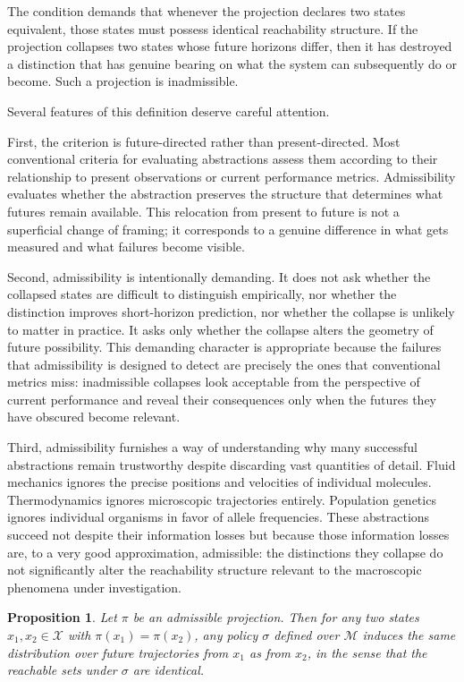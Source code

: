 \documentclass[12pt,a4paper]{article}
\theoremstyle{plain}
\newtheorem{proposition}{Proposition}
\theoremstyle{definition}
\theoremstyle{remark}
\begin{document}
The condition demands that whenever the projection declares two states
equivalent, those states must possess identical reachability structure. If
the projection collapses two states whose future horizons differ, then it has
destroyed a distinction that has genuine bearing on what the system can
subsequently do or become. Such a projection is inadmissible.

Several features of this definition deserve careful attention.

First, the criterion is future-directed rather than present-directed. Most
conventional criteria for evaluating abstractions assess them according to
their relationship to present observations or current performance metrics.
Admissibility evaluates whether the abstraction preserves the structure that
determines what futures remain available. This relocation from present to
future is not a superficial change of framing; it corresponds to a genuine
difference in what gets measured and what failures become visible.

Second, admissibility is intentionally demanding. It does not ask whether
the collapsed states are difficult to distinguish empirically, nor whether
the distinction improves short-horizon prediction, nor whether the collapse
is unlikely to matter in practice. It asks only whether the collapse alters
the geometry of future possibility. This demanding character is appropriate
because the failures that admissibility is designed to detect are precisely
the ones that conventional metrics miss: inadmissible collapses look
acceptable from the perspective of current performance and reveal their
consequences only when the futures they have obscured become relevant.

Third, admissibility furnishes a way of understanding why many successful
abstractions remain trustworthy despite discarding vast quantities of detail.
Fluid mechanics ignores the precise positions and velocities of individual
molecules. Thermodynamics ignores microscopic trajectories entirely.
Population genetics ignores individual organisms in favor of allele
frequencies. These abstractions succeed not despite their information losses
but because those information losses are, to a very good approximation,
admissible: the distinctions they collapse do not significantly alter the
reachability structure relevant to the macroscopic phenomena under
investigation.

\begin{proposition}
Let $\pi$ be an admissible projection. Then for any two states
$x_1, x_2 \in \mathcal{X}$ with $\pi(x_1) = \pi(x_2)$, any policy
$\sigma$ defined over $\mathcal{M}$ induces the same distribution over
future trajectories from $x_1$ as from $x_2$, in the sense that the
reachable sets under $\sigma$ are identical.
\end{proposition}
\end{document}
